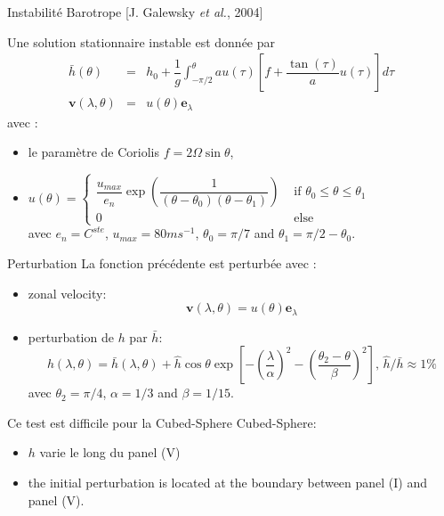 \documentclass[11pt]{beamer}
\def\gint{\displaystyle\int}
\begin{document}
\begin{frame}{Instabilité Barotrope [J. Galewsky \textit{et al.}, 2004]}

\begin{exampleblock}{}
Une solution stationnaire instable est donnée par
\begin{equation}
\begin{array}{rcl}
\bar{h}(\theta) & = & h_0 + \dfrac{1}{g}\gint^{\theta}_{-\pi/2} a u(\tau) \left[ f + \dfrac{\tan(\tau)}{a} u(\tau) \right] d \tau \\
\mathbf{v}(\lambda,\theta) & = & u(\theta) \mathbf{e}_{\lambda}
\end{array}
\end{equation}
avec :
\begin{itemize}
\item le paramètre de Coriolis $f = 2 \Omega \sin \theta$,
\item $u(\theta)=\left\lbrace
\begin{array}{ll}
\dfrac{u_{max}}{e_n} \exp\left( \dfrac{1}{(\theta-\theta_0)(\theta-\theta_1)} \right) & \text{ if } \theta_0 \leq \theta \leq \theta_1 \\
0 & \text{ else}
\end{array}\right.$\\
 avec $e_n=C^{ste}$, $u_{max} = 80 ms^{-1}$, $\theta_0 = \pi/7$ and $\theta_1 = \pi/2 - \theta_0$.
\end{itemize}
\end{exampleblock}
\end{frame}



\begin{frame}{}
\begin{exampleblock}{Perturbation}
La fonction précédente est perturbée avec :
\begin{itemize}
\item zonal velocity:
$$\mathbf{v}(\lambda,\theta) = u(\theta) \mathbf{e}_{\lambda}$$
\item perturbation de $h$ par $\bar{h}$:
$$h(\lambda,\theta) = \bar{h}(\lambda,\theta) + \hat{h} \cos \theta \exp \left[ - \left( \dfrac{\lambda}{\alpha} \right)^2 - \left( \dfrac{\theta_2 - \theta}{\beta} \right)^2 \right] \text{, } \hat{h}/\bar{h} \approx 1 \%$$
avec $\theta_2 = \pi/4$, $\alpha = 1/3$ and $\beta = 1/15$.
\end{itemize}
\end{exampleblock}

\begin{block}{}
Ce test est difficile pour la Cubed-Sphere Cubed-Sphere:

\begin{itemize}
\item $h$ varie le long du panel (V)
\item the initial perturbation is located at the boundary between panel (I) and panel (V).
\end{itemize}
\end{block}
\end{frame}
\end{document}
